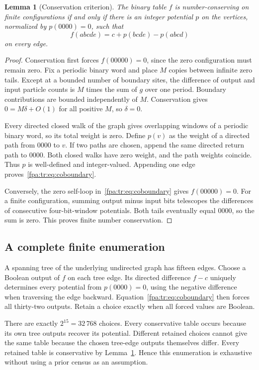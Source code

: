 \documentclass[11pt,a4paper]{article}
\numberwithin{equation}{section}
\newtheorem{lemma}[theorem]{Lemma}
\begin{document}
\begin{lemma}[Conservation criterion]\label{fpa:tr:lem:potential}
The binary table $f$ is number-conserving on finite configurations if and only if there is an integer potential $p$ on the vertices, normalized by $p(0000)=0$, such that
\begin{equation}\label{fpa:tr:eq:coboundary}
f(abcde)=c+p(bcde)-p(abcd)
\end{equation}
on every edge.
\end{lemma}
\begin{proof}
Conservation first forces $f(00000)=0$, since the zero configuration must remain zero. Fix a periodic binary word and place $M$ copies between infinite zero tails. Except at a bounded number of boundary sites, the difference of output and input particle counts is $M$ times the sum of $g$ over one period. Boundary contributions are bounded independently of $M$. Conservation gives $0=M\delta+O(1)$ for all positive $M$, so $\delta=0$.

Every directed closed walk of the graph gives overlapping windows of a periodic binary word, so its total weight is zero. Define $p(v)$ as the weight of a directed path from $0000$ to $v$. If two paths are chosen, append the same directed return path to $0000$. Both closed walks have zero weight, and the path weights coincide. Thus $p$ is well-defined and integer-valued. Appending one edge proves~\eqref{fpa:tr:eq:coboundary}.

Conversely, the zero self-loop in~\eqref{fpa:tr:eq:coboundary} gives $f(00000)=0$. For a finite configuration, summing output minus input bits telescopes the differences of consecutive four-bit-window potentials. Both tails eventually equal $0000$, so the sum is zero. This proves finite number conservation.
\end{proof}

\subsection{A complete finite enumeration}
A spanning tree of the underlying undirected graph has fifteen edges. Choose a Boolean output of $f$ on each tree edge. Its directed difference $f-c$ uniquely determines every potential from $p(0000)=0$, using the negative difference when traversing the edge backward. Equation~\eqref{fpa:tr:eq:coboundary} then forces all thirty-two outputs. Retain a choice exactly when all forced values are Boolean.

There are exactly $2^{15}=32\,768$ choices. Every conservative table occurs because its own tree outputs recover its potential. Different retained choices cannot give the same table because the chosen tree-edge outputs themselves differ. Every retained table is conservative by Lemma~\ref{fpa:tr:lem:potential}. Hence this enumeration is exhaustive without using a prior census as an assumption.
\end{document}
